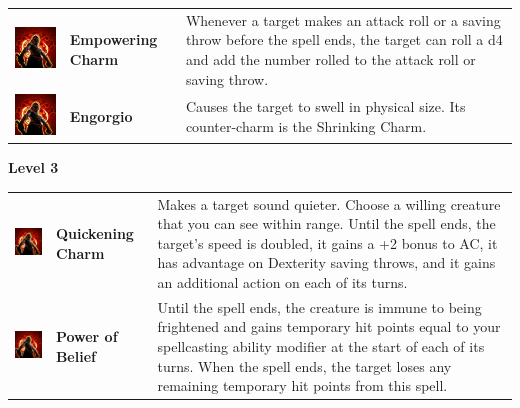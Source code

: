\begin{tabular}{ m{4cm}m{3cm}m{6cm} } 
	\includegraphics[width=4cm]{../Pictures/Gameplay/Spells/Icon/spell_icon.png} & \textbf{Empowering Charm} & Whenever a target makes an attack roll or a saving throw before the spell ends, the target can roll a d4 and add the number rolled to the attack roll or saving throw. \\ %
\includegraphics[width=4cm]{../Pictures/Gameplay/Spells/Icon/spell_icon.png} & \textbf{Engorgio} & Causes the target to swell in physical size. Its counter-charm is the Shrinking Charm. \\ 
\end{tabular}
\textbf{Level 3 } 
\begin{tabular}{ m{4cm}m{3cm}m{6cm} } 
	\includegraphics[width=4cm]{../Pictures/Gameplay/Spells/Icon/spell_icon.png} & \textbf{Quickening Charm} & Makes a target sound quieter. Choose a willing creature that you can see within range. Until the spell ends, the target's speed is doubled, it gains a +2 bonus to AC, it has advantage on Dexterity saving throws, and it gains an additional action on each of its turns. \\ 
   \includegraphics[width=4cm]{../Pictures/Gameplay/Spells/Icon/spell_icon.png} & \textbf{Power of Belief } & Until the spell ends, the creature is immune to being frightened and gains temporary hit points equal to your spellcasting ability modifier at the start of each of its turns. When the spell ends, the target loses any remaining temporary hit points from this spell. \\  %
\end{tabular}
